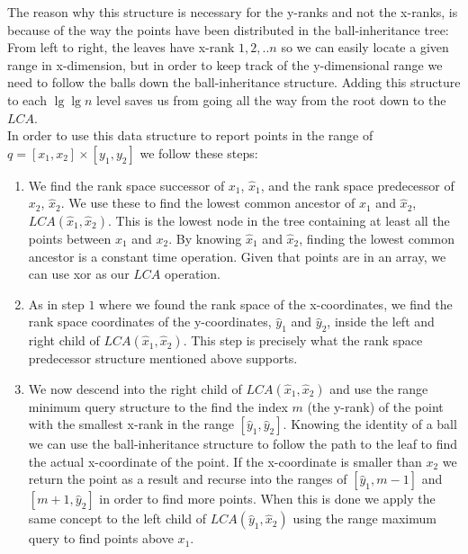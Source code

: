 The reason why this structure is necessary for the y-ranks and not the x-ranks, is because of the way the points have been distributed in the ball-inheritance tree: From left to right, the leaves have x-rank $1,2,..n$ so we can easily locate a given range in x-dimension, but in order to keep track of the y-dimensional range we need to follow the balls down the ball-inheritance structure. Adding this structure to each $\lg \lg n$ level saves us from going all the way from the root down to the $LCA$. \\

In order to use this data structure to report points in the range of $q = [x_1, x_2] \times [y_1, y_2]$ we follow these steps:
\begin{enumerate}
  \item We find the rank space successor of $x_1$, $\hat{x}_1$, and the rank space predecessor of $x_2$, $\hat{x}_2$. We use these to find the lowest common ancestor of $\hat{x}_1$ and $\hat{x}_2$, $LCA(\hat{x}_1, \hat{x}_2)$. This is the lowest node in the tree containing at least all the points between $x_1$ and $x_2$. By knowing $\hat{x}_1$ and $\hat{x}_2$, finding the lowest common ancestor is a constant time operation. Given that points are in an array, we can use xor as our $LCA$ operation. 
  \item As in step $1$ where we found the rank space of the x-coordinates, we find the rank space coordinates of the y-coordinates, $\hat{y}_1$ and $\hat{y}_2$, inside the left and right child of $LCA(\hat{x}_1, \hat{x}_2)$. This step is precisely what the rank space predecessor structure mentioned above supports.
  \item We now descend into the right child of $LCA(\hat{x}_1, \hat{x}_2)$ and use the range minimum query structure to the find the index $m$ (the y-rank) of the point with the smallest x-rank in the range $[\hat{y}_1, \hat{y}_2]$. Knowing the identity of a ball we can use the ball-inheritance structure to follow the path to the leaf to find the actual x-coordinate of the point. If the x-coordinate is smaller than $x_2$ we return the point as a result and recurse into the ranges of $[\hat{y}_1, m-1]$ and $[m+1, \hat{y}_2]$ in order to find more points. When this is done we apply the same concept to the left child of $LCA(\hat{y}_1, \hat{x}_2)$ using the range maximum query to find points above $x_1$.
\end{enumerate}


